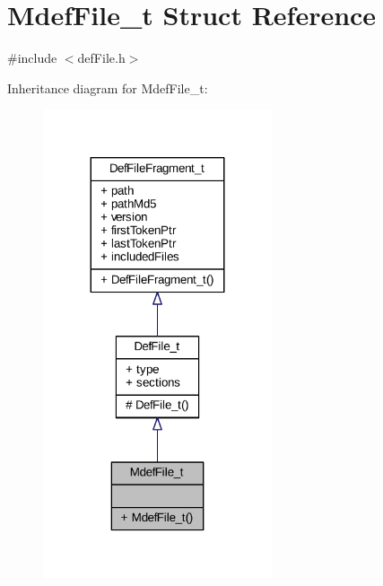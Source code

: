 \hypertarget{struct_mdef_file__t}{}\section{Mdef\+File\+\_\+t Struct Reference}
\label{struct_mdef_file__t}


{\ttfamily \#include $<$def\+File.\+h$>$}



Inheritance diagram for Mdef\+File\+\_\+t\+:
\nopagebreak
\begin{figure}[H]
\begin{center}
\leavevmode
\includegraphics[width=191pt]{struct_mdef_file__t__inherit__graph}
\end{center}
\end{figure}


